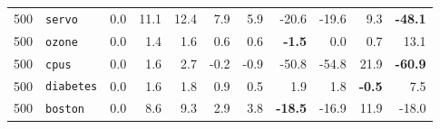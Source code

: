 \begin{table}[htbp]
\begin{tabular}{rlrrrrrrrrr}
500 & \texttt{servo} & 0.0 & 11.1 & 12.4 & 7.9 & 5.9 & -20.6 & -19.6 & 9.3 & \textbf{-48.1} \\
500 & \texttt{ozone} & 0.0 & 1.4 & 1.6 & 0.6 & 0.6 & \textbf{-1.5} & 0.0 & 0.7 & 13.1 \\
500 & \texttt{cpus} & 0.0 & 1.6 & 2.7 & -0.2 & -0.9 & -50.8 & -54.8 & 21.9 & \textbf{-60.9} \\
500 & \texttt{diabetes} & 0.0 & 1.6 & 1.8 & 0.9 & 0.5 & 1.9 & 1.8 & \textbf{-0.5} & 7.5 \\
500 & \texttt{boston} & 0.0 & 8.6 & 9.3 & 2.9 & 3.8 & \textbf{-18.5} & -16.9 & 11.9 & -18.0 \\
\bottomrule
\end{tabular}
\end{table}
